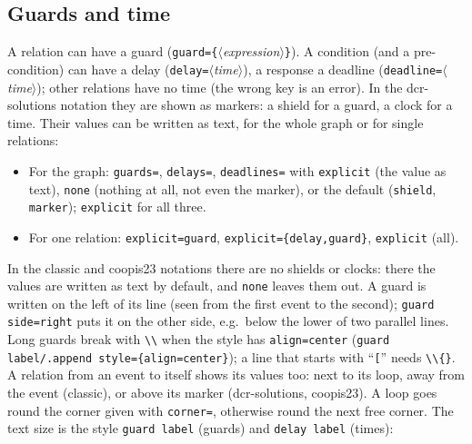 \documentclass[a4paper,11pt]{article}
\newcommand\example[1]{%
  \begin{tcolorbox}[colback=white, colframe=black!25, boxrule=0.4pt,
      arc=1mm, left=2mm, right=2mm, halign lower=flush center]
    
    \tcblower
    
  \end{tcolorbox}}
\newcommand\cs[1]{\texttt{\textbackslash#1}}
\newcommand\key[1]{\texttt{#1}}
\newcommand\meta[1]{\ensuremath{\langle}\textit{#1}\ensuremath{\rangle}}
\begin{document}
\subsection{Guards and time}\label{sec:values}
A relation can have a guard (\key{guard=\{}\meta{expression}\key{\}}). A
condition (and a pre-condition) can have a delay (\key{delay=}\meta{time}),
a response a deadline (\key{deadline=}\meta{time}); other relations have no
time (the wrong key is an error). In the dcr-solutions notation they are shown as markers: a shield for a
guard, a clock for a time. Their values can be written as text, for the
whole graph or for single relations:
\example{values}
\begin{itemize}
  \item For the graph: \key{guards=}, \key{delays=},
    \key{deadlines=} with \key{explicit} (the value as text), \key{none}
    (nothing at all, not even the marker), or the default (\key{shield},
    \key{marker}); \key{explicit} for all three.
  \item For one relation: \key{explicit=guard}, \key{explicit=\{delay,guard\}},
    \key{explicit} (all).
\end{itemize}
In the classic and coopis23 notations there are no shields or clocks:
there the values are written as text by default, and \key{none} leaves them out.
A guard is written on the left of its line (seen from the first event to
the second); \key{guard side=right} puts it on the other side, e.g.\ below
the lower of two parallel lines. Long guards break with \cs{\textbackslash}
when the style has \key{align=center}
(\key{guard label/.append style=\{align=center\}}); a line that starts with
``\texttt{[}'' needs \cs{\textbackslash\{\}}.
A relation from an event to itself shows its values too: next to its loop,
away from the event (classic), or above its marker (dcr-solutions,
coopis23). A loop goes round the corner given with
\key{corner=}, otherwise round the next free corner. The text size is the
style \key{guard label} (guards) and \key{delay label} (times):
\example{self-values}
\end{document}
